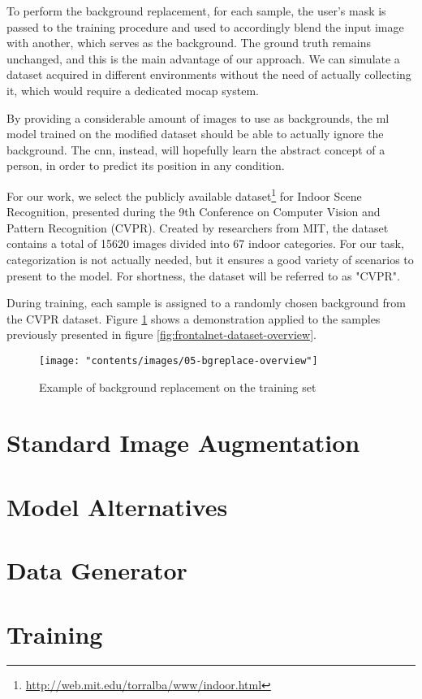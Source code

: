 To perform the background replacement, for each sample, the user's mask is passed to the training procedure and used to accordingly blend the input image with another, which serves as the background. The ground truth remains unchanged, and this is the main advantage of our approach. We can simulate a dataset acquired in different environments without the need of actually collecting it, which would require a dedicated \gls{mocap} system.

By providing a considerable amount of images to use as backgrounds, the \gls{ml} model trained on the modified dataset should be able to actually ignore the background. The \gls{cnn}, instead, will hopefully learn the abstract concept of a person, in order to predict its position in any condition.

\medskip

For our work, we select the publicly available dataset\footnote{\url{http://web.mit.edu/torralba/www/indoor.html}} for Indoor Scene Recognition, presented during the 9th Conference on Computer Vision and Pattern Recognition (CVPR). Created by researchers from MIT\cite{cvpr09}, the dataset contains a total of 15620 images divided into 67 indoor categories. For our task, categorization is not actually needed, but it ensures a good variety of scenarios to present to the model. For shortness, the dataset will be referred to as "CVPR".

During training, each sample is assigned to a randomly chosen background from the CVPR dataset. Figure \ref{fig:bgreplace-example} shows a demonstration applied to the samples previously presented in figure \ref{fig:frontalnet-dataset-overview}. 

\begin{figure}[!htb]
	\centering
	\texttt{[image: "contents/images/05-bgreplace-overview"]}
	\caption[Example of background replacement on the training set]{Example of background replacement on the training set}
	\label{fig:bgreplace-example}
\end{figure}
\clearpage




\section{Standard Image Augmentation}
\label{sec:implementation-imgaug}

\lipsum[1]



\section{Model Alternatives}
\label{sec:model-variants}

\lipsum[1]




\section{Data Generator}
\label{sec:implementation-generator}

\lipsum[1]




\section{Training}
\label{sec:implementation-training}

\lipsum[1]


